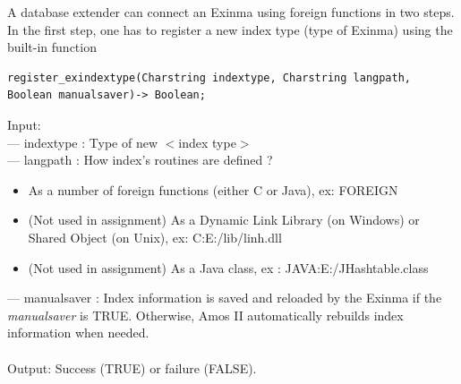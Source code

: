 \documentclass[12pt]{article}
\begin{document}
A database extender can connect an Exinma using foreign functions in two steps. In the first step, one has to register a new index type (type of Exinma) using the built-in function\\
\begin{lstlisting}[caption={Definition of register\_exindextype},label={lst:registerindextype}]
register_exindextype(Charstring indextype, Charstring langpath, Boolean manualsaver)-> Boolean;
\end{lstlisting}
Input:\\
--- indextype : Type of new $<$index type$>$\\
--- langpath  : How index's routines are defined ?
\begin{itemize}
\item As a number of foreign functions (either C or Java), ex: FOREIGN
\item (Not used in assignment) As a Dynamic Link Library (on Windows) or Shared Object (on Unix), ex: C:E:/lib/linh.dll
\item (Not used in assignment) As a Java class, ex : JAVA:E:/JHashtable.class
\end{itemize}
--- manualsaver : Index information is saved and reloaded by the Exinma if the \emph{manualsaver} is TRUE. Otherwise, Amos II automatically rebuilds index information when needed. \\\\
Output: Success (TRUE) or failure (FALSE).
\end{document}
